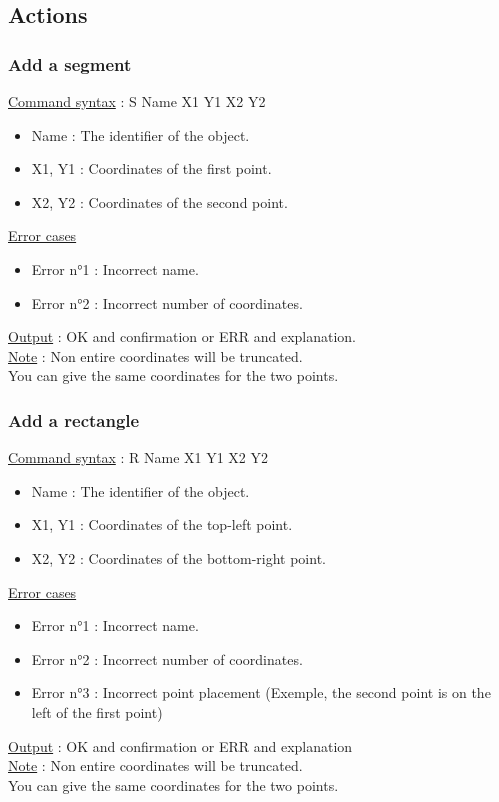 \documentclass[a4paper, 12pts]{article}
\begin{document}
	\subsection{Actions}
		\subsubsection{Add a segment}
			\uline{Command syntax} :
			S Name X1 Y1 X2 Y2
			\begin{itemize}
				\item Name : The identifier of the object.
				\item X1, Y1 : Coordinates of the first point.
				\item X2, Y2 : Coordinates of the second point.
			\end{itemize}
			\uline{Error cases}
			\begin{itemize}
				\item Error n°1 : Incorrect name.
				\item Error n°2 : Incorrect number of coordinates.
			\end{itemize}
			\uline{Output} : OK and confirmation or ERR and explanation.\\
			\uline{Note} : 
			Non entire coordinates will be truncated.\\
			You can give the same coordinates for the two points.

		\subsubsection{Add a rectangle}
			\uline{Command syntax} :
			R Name X1 Y1 X2 Y2
			\begin{itemize}
				\item Name : The identifier of the object.
				\item X1, Y1 : Coordinates of the top-left point.
				\item X2, Y2 : Coordinates of the bottom-right point.
			\end{itemize}
			\uline{Error cases}
			\begin{itemize}
				\item Error n°1 : Incorrect name.
				\item Error n°2 : Incorrect number of coordinates.
				\item Error n°3 : Incorrect point placement (Exemple, the second point is on the left of the first point)
			\end{itemize}
			\uline{Output} : OK and confirmation or ERR and explanation\\
			\uline{Note} : 
			Non entire coordinates will be truncated.\\
			You can give the same coordinates for the two points.
\end{document}
